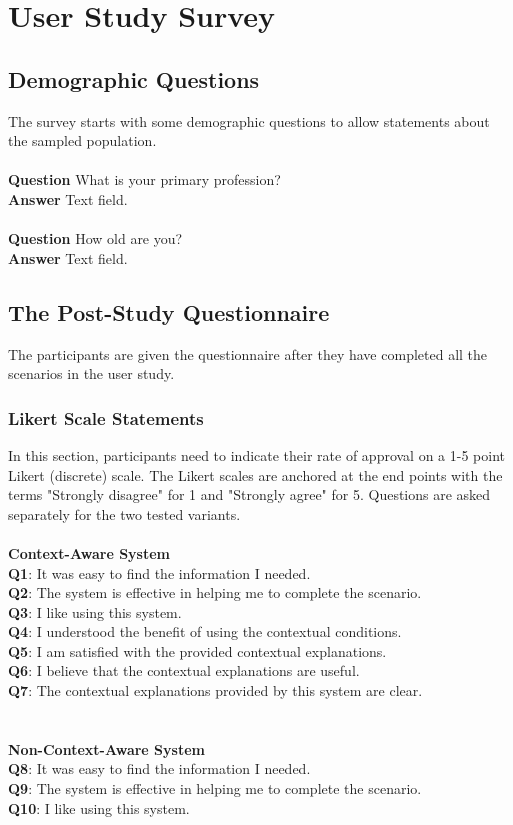 \chapter{User Study Survey} \label{appendix:survey}

\section{Demographic Questions} 
The survey starts with some demographic questions to allow statements about the sampled population.
\\ \\
\textbf{Question} What is your primary profession? \\
\textbf{Answer} Text field. \\ \\
\textbf{Question} How old are you? \\
\textbf{Answer} Text field.

\section{The Post-Study Questionnaire} 
The participants are given the questionnaire after they have completed all the scenarios in the user study.
\subsection{Likert Scale Statements}
In this section, participants need to indicate their rate of approval on a 1-5 point Likert (discrete) scale. The Likert scales are anchored at the end points with the terms "Strongly disagree" for 1 and "Strongly agree" for 5. Questions are asked separately for the two tested variants.
\\ \\
\textbf{Context-Aware System} \\
\textbf{Q1}: It was easy to find the information I needed. \\
\textbf{Q2}: The system is effective in helping me to complete the scenario. \\
\textbf{Q3}: I like using this system. \\
\textbf{Q4}: I understood the benefit of using the contextual conditions.  \\
\textbf{Q5}: I am satisfied with the provided contextual explanations.  \\
\textbf{Q6}: I believe that the contextual explanations are useful. \\
\textbf{Q7}: The contextual explanations provided by this system are clear.  \\
\\ \\
\textbf{Non-Context-Aware System} \\
\textbf{Q8}: It was easy to find the information I needed.  \\
\textbf{Q9}: The system is effective in helping me to complete the scenario.  \\
\textbf{Q10}: I like using this system.

